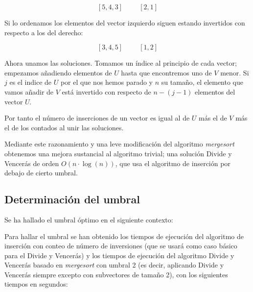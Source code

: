\[[5,4,3] \hspace{1cm} [2,1]\]

Si lo ordenamos los elementos del vector izquierdo siguen estando invertidos con respecto a los del derecho:

\[[3,4,5] \hspace{1cm} [1,2]\]

Ahora unamos las soluciones. Tomamos un índice al principio de cada vector; empezamos añadiendo elementos de $U$ hasta que encontremos uno de $V$ menor. Si $j$ es el indice de $U$ por el que nos hemos parado y $n$ su tamaño, el elemento que vamos añadir de $V$ está invertido con respecto de $n-(j-1)$ elementos del vector $U$.

Por tanto el número de inserciones de un vector es igual al de $U$ más el de $V$ más el de los contados al unir las soluciones.

Mediante este razonamiento y una leve modificación del algoritmo \textit{mergesort} obtenemos una mejora sustancial al algoritmo trivial; una solución Divide y Vencerás de orden $O(n\cdot \log(n))$, que usa el algoritmo de inserción por debajo de cierto umbral.

\subsection{Determinación del umbral}

Se ha hallado el umbral óptimo en el siguiente contexto:


Para hallar el umbral se han obtenido los tiempos de ejecución del algoritmo de inserción con conteo de número de inversiones (que se usará como caso básico para el Divide y Vencerás) y los tiempos de ejecución del algoritmo Divide y Vencerás basado en \textit{mergesort} con umbral 2 (es decir, aplicando Divide y Vencerás siempre excepto con subvectores de tamaño 2), con los siguientes tiempos en segundos:


\vspace*{1cm}

\prefIns
{}\prefDVt
{} {\prefIns}

\pgfplotstabletypeset[
display columns/0/.style={column name=Tamaño},
display columns/1/.style={column name=Inserción},
display columns/2/.style={column name=Mergesort},
]{\prefIns}

